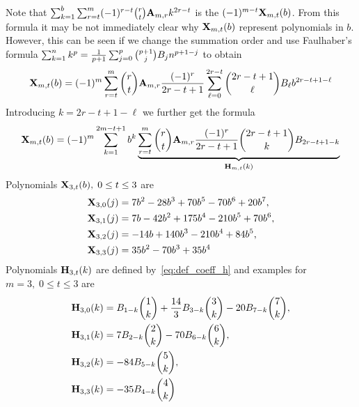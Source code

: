 Note that
$\sum_{k=1}^{b} \sum_{r=t}^{m} (-1)^{r-t} \binom{r}{t} {\mathbf{A}} \sb{m,r} k^{2r-t}$
is the
$(-1)^{m-t} {\mathbf{X}}\sb{m,t} (b)$.
From this formula it may be not immediately clear why ${\mathbf{X}}\sb{m,t} (b)$ represent polynomials in $b$.
However, this can be seen if we change the summation order and use Faulhaber's formula
$\sum_{k=1}^{n} k^{p}=\frac{1}{p+1}\sum _{j=0}^{p} \binom{p+1}{j} {B}\sb{j} n^{p+1-j}$
to obtain
\begin{equation*}
    {\mathbf{X}}\sb{m,t} (b) = (-1)^m \sum_{r=t}^{m} \binom{r}{t} {\mathbf{A}} \sb{m,r} \frac{(-1)^r}{2r-t+1}
    \sum_{\ell=0}^{2r-t} \binom{2r-t+1}{\ell} {B}\sb{\ell} b^{2r-t+1-\ell}
\end{equation*}
Introducing $k=2r-t+1-\ell$ we further get the formula
\begin{equation*}
    {\mathbf{X}}\sb{m,t} (b) = (-1)^m \sum_{k=1}^{2m-t+1} b^k
    \underbrace{\sum_{r=t}^m \binom{r}{t} {\mathbf{A}} \sb{m,r} \frac{(-1)^r}{2r-t+1} \binom{2r-t+1}{k}
    {B}\sb{2r-t+1-k}}_{{\mathbf{H}} \sb{m,t} (k)}
\end{equation*}
Polynomials ${\mathbf{X}}\sb{3,t} (b), \; 0\leq t \leq 3$ are
\begin{equation*}
    \begin{split}
        {\mathbf{X}}\sb{3,0} (j)
        &=7 b^2 - 28 b^3 + 70 b^5 - 70 b^6 + 20 b^7, \\
        {\mathbf{X}}\sb{3,1} (j)
        &=7 b - 42 b^2 + 175 b^4 - 210 b^5 + 70 b^6, \\
        {\mathbf{X}}\sb{3,2} (j)
        &=-14 b + 140 b^3 - 210 b^4 + 84 b^5, \\
        {\mathbf{X}}\sb{3,3} (j)
        &=35 b^2 - 70 b^3 + 35 b^4
    \end{split}
\end{equation*}
Polynomials ${\mathbf{H}} \sb{3,t} (k)$ are defined by~\eqref{eq:def_coeff_h} and examples for $m=3, \; 0\leq t \leq 3$ are
\begin{equation*}
    \begin{split}
        {\mathbf{H}} \sb{3,0} (k)
        &={B}\sb{1-k} \binom{1}{k} + \frac{14}{3} {B}\sb{3-k} \binom{3}{k} - 20 {B}\sb{7 - k} \binom{7}{k}, \\
        {\mathbf{H}} \sb{3,1} (k)
        &=7 {B}\sb{2-k} \binom{2}{k} - 70 {B}\sb{6-k} \binom{6}{k}, \\
        {\mathbf{H}} \sb{3,2} (k)
        &=-84 {B}\sb{5-k} \binom{5}{k}, \\
        {\mathbf{H}} \sb{3,3} (k)
        &=-35 {B}\sb{4-k} \binom{4}{k}
    \end{split}
\end{equation*}
